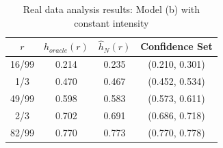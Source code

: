\documentclass[12pt]{amsart}
\theoremstyle{plain}
\theoremstyle{remark}
\numberwithin{equation}{section}
\begin{document}
\begin{table}[t]
\centering
\renewcommand{\arraystretch}{0.75}
\setlength{\tabcolsep}{10pt}
\begin{tabular}{|c|c|c|c|}
\hline
$r$ & ${h}_{oracle}(r)$ & $\hat{h}_N(r)$ & Confidence Set\\
\hline
16/99 & 0.214 & 0.235 & (0.210, 0.301)\\
1/3 & 0.470 & 0.467 & (0.452, 0.534)\\
49/99 & 0.598 & 0.583 & (0.573, 0.611)\\
2/3 & 0.702 & 0.691 & (0.686, 0.718)\\
82/99 & 0.770 & 0.773 & (0.770, 0.778)\\
\hline
\end{tabular}
\centering
\caption{\centering Real data analysis results: Model (b) with constant intensity}
\label{tab:real2}
\end{table}
\end{document}
